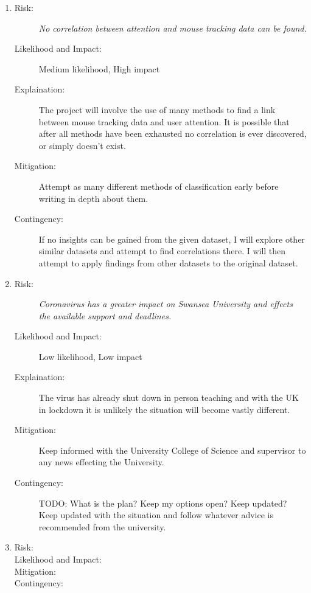 \documentclass{article}
\begin{document}
\begin{enumerate}
    \item 
    \begin{description}
        \item[Risk:]    
        \emph{No correlation between attention and mouse tracking data can be found.}    
        \item[Likelihood and Impact:]
        Medium likelihood, High impact
        \item[Explaination:]
        The project will involve the use of many methods to find a link between mouse tracking data and user attention.
        It is possible that after all methods have been exhausted no correlation is ever discovered, or simply doesn't exist. 
        \item[Mitigation:]
        Attempt as many different methods of classification early before writing in depth about them.  
        \item[Contingency:]
        If no insights can be gained from the given dataset, I will explore other similar datasets and attempt to find correlations there.
        I will then attempt to apply findings from other datasets to the original dataset. 
    \end{description}

    \item 
    \begin{description}
        \item[Risk:]    
        \emph{Coronavirus has a greater impact on Swansea University and  effects the available support and deadlines.}
        \item[Likelihood and Impact:]
        Low likelihood, Low impact
        \item[Explaination:]
        The virus has already shut down in person teaching and with the UK in lockdown it is unlikely the situation will become vastly different. 
        \item[Mitigation:]
        Keep informed with the University College of Science and supervisor to any news effecting the University.
        \item[Contingency:]
        TODO: What is the plan? Keep my options open? Keep updated?
        Keep updated with the situation and follow whatever advice is recommended from the university.
    \end{description}

    \item 
    \begin{description}
        \item[Risk:]    
        \item[Likelihood and Impact:]
        \item[Mitigation:]
        \item[Contingency:]
    \end{description}
\end{enumerate}
\end{document}
